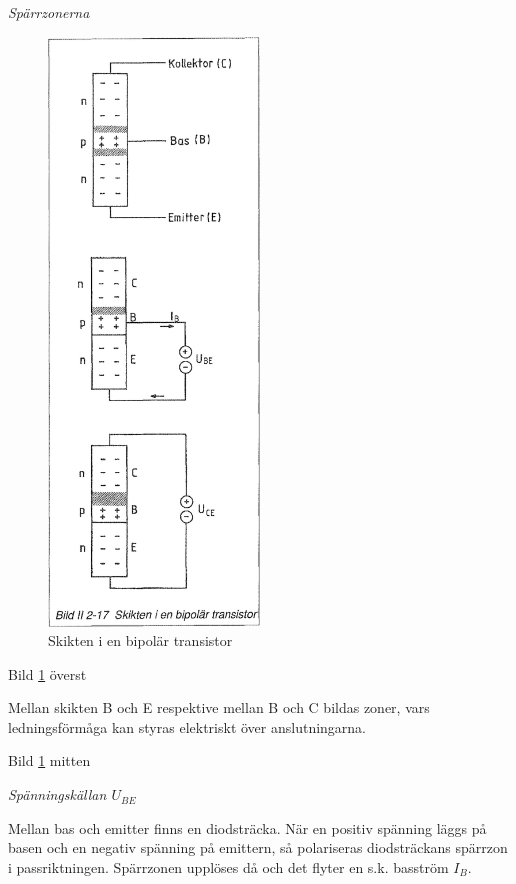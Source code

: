 
\emph{Spärrzonerna}

\begin{figure}
\includegraphics[width=0.5\textwidth]{images/bild_2_2-17}
\caption{Skikten i en bipolär transistor}
\label{fig:BildII2-17}
\end{figure}

Bild \ref{fig:BildII2-17} överst

Mellan skikten B och E respektive mellan B och C bildas zoner, vars
ledningsförmåga kan styras elektriskt över anslutningarna.

Bild \ref{fig:BildII2-17} mitten

\emph{Spänningskällan \(U_{BE}\)}

Mellan bas och emitter finns en diodsträcka. När en positiv spänning läggs på
basen och en negativ spänning på emittern, så polariseras diodsträckans spärrzon
i passriktningen. Spärrzonen upplöses då och det flyter en s.k. basström
\(I_B\).

